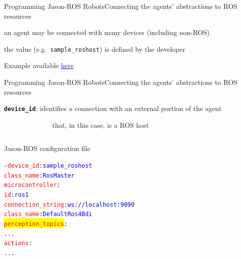 \documentclass[compress]{beamer}
\newcommand{\yamlkey}[1]{\textcolor{red}{\texttt{#1}}}
\newcommand{\yamlvalue}[1]{\textcolor{blue}{\texttt{#1}}}
\newcommand{\link}[2]{\href{#1}{\underline{\textcolor{blue}{#2}}}}
\begin{document}
\begin{frame}[fragile]{Programming Jason-ROS Robots}{Connecting the agents' abstractions to ROS resources}
  
    \vspace{.3cm}
  
    an agent may be connected with many devices {\tiny (including non-ROS)}\\ \vspace{-.2cm}
  
    the value (e.g.~\texttt{sample\_roshost}) is defined by the developer
    
     \vfill
    {\tiny Example available \link{https://github.com/issia-2026-jason-ros/turtle-example/blob/master/src/agt/robot1.yaml}{here}}
    
\end{frame}




\begin{frame}[fragile]{Programming Jason-ROS Robots}{Connecting the agents' abstractions to ROS resources}

    \footnotesize
    \texttt{{\bf device\_id}}: identifies a connection with an external portion of the agent\\ 
    
    \vspace{-.5cm}
    
    \ \ \ \ \ \ \ \ \ \ \ \ \ \ {\tiny that, in this case, is a ROS host}

    
    \begin{columns}
       \begin{column}{.42\textwidth}      
            \begin{block}{{\scriptsize Jason-ROS configuration file}}
                \scriptsize
                \begin{alltt} \tiny
- \yamlkey{device\_id}: \yamlvalue{sample\_roshost}
  \yamlkey{class_name}: \yamlvalue{RosMaster}
  \yamlkey{microcontroller}: 
    \yamlkey{id}: \yamlvalue{ros1} 
    \yamlkey{connection_string}: \yamlvalue{ws://localhost:9090} 
    \yamlkey{class_name}: \yamlvalue{DefaultRos4Bdi}
  \colorbox{yellow}{\yamlkey{perception_topics}}:         
    ...
  \yamlkey{actions}:       
    ...
                \end{alltt}

            \end{block}    
        \end{column}
        
        \hspace{-25pt} %
  
        \begin{column}{.55\textwidth} \scriptsize
  

\end{column}
\end{columns}
\end{frame}
\end{document}
